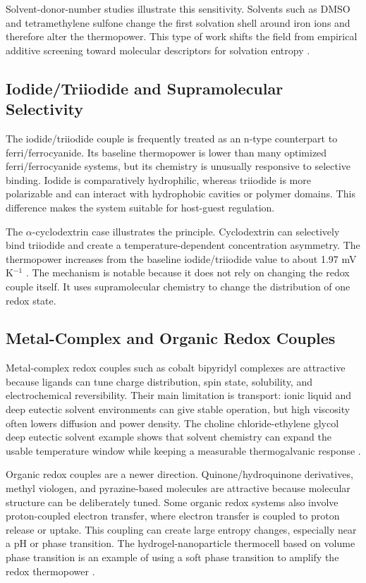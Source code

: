 \documentclass[a4paper,12pt]{report}
\begin{document}
Solvent-donor-number studies illustrate this sensitivity. Solvents such as
DMSO and tetramethylene sulfone change the first solvation shell around iron
ions and therefore alter the thermopower. This type of work shifts the field
from empirical additive screening toward molecular descriptors for solvation
entropy \citep{chen2023solvation}.

\subsection{Iodide/Triiodide and Supramolecular Selectivity}

The iodide/triiodide couple is frequently treated as an n-type counterpart to
ferri/ferrocyanide. Its baseline thermopower is lower than many optimized
ferri/ferrocyanide systems, but its chemistry is unusually responsive to
selective binding. Iodide is comparatively hydrophilic, whereas triiodide is
more polarizable and can interact with hydrophobic cavities or polymer domains.
This difference makes the system suitable for host-guest regulation.

The $\alpha$-cyclodextrin case illustrates the principle. Cyclodextrin can
selectively bind triiodide and create a temperature-dependent concentration
asymmetry. The thermopower increases from the baseline iodide/triiodide value
to about 1.97 mV K$^{-1}$ \citep{zhou2016supramolecular}. The mechanism is
notable because it does not rely on changing the redox couple itself. It
uses supramolecular chemistry to change the distribution of one redox state.

\subsection{Metal-Complex and Organic Redox Couples}

Metal-complex redox couples such as cobalt bipyridyl complexes are attractive
because ligands can tune charge distribution, spin state, solubility, and
electrochemical reversibility. Their main limitation is transport: ionic
liquid and deep eutectic solvent environments can give stable operation, but
high viscosity often lowers diffusion and power density. The choline
chloride-ethylene glycol deep eutectic solvent example shows that solvent
chemistry can expand the usable temperature window while keeping a measurable
thermogalvanic response \citep{antariksa2021deep}.

Organic redox couples are a newer direction. Quinone/hydroquinone derivatives,
methyl viologen, and pyrazine-based molecules are attractive because molecular
structure can be deliberately tuned. Some organic redox systems also involve
proton-coupled electron transfer, where electron transfer is coupled to proton
release or uptake. This coupling can create large entropy changes, especially
near a pH or phase transition. The hydrogel-nanoparticle thermocell based on
volume phase transition is an example of using a soft phase transition to
amplify the redox thermopower \citep{guo2020nanoparticle}.
\end{document}

